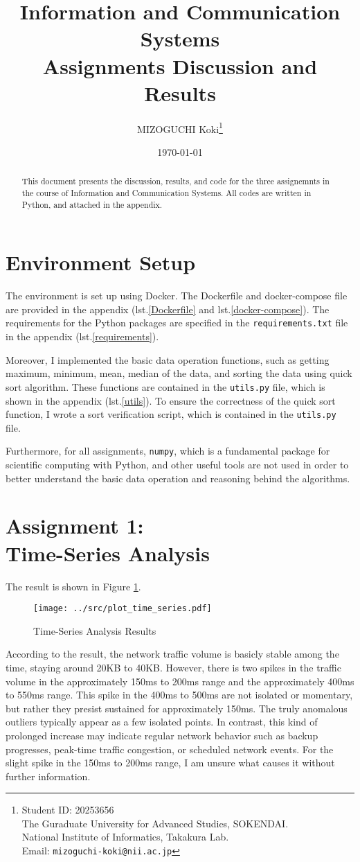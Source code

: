 \documentclass{article}
\title{Information and Communication Systems\\ Assignments Discussion and Results}
\author{MIZOGUCHI Koki\thanks{Student ID: 20253656\\ The Guraduate University for Advanced Studies, SOKENDAI.\\ National Institute of Informatics, Takakura Lab. \\ Email: \texttt{mizoguchi-koki@nii.ac.jp}}}
\date{\today}
\begin{document}
\maketitle
\begin{abstract}
	This document presents the discussion, results, and code for the three assignemnts in the course of Information and Communication Systems.
	All codes are written in Python, and attached in the appendix.
\end{abstract}
\section{Environment Setup}
The environment is set up using Docker.
The Dockerfile and docker-compose file are provided in the appendix (lst.\ref{Dockerfile} and lst.\ref{docker-compose}).
The requirements for the Python packages are specified in the \texttt{requirements.txt} file in the appendix (lst.\ref{requirements}).

Moreover, I implemented the basic data operation functions, such as getting maximum, minimum, mean, median of the data, and sorting the data using quick sort algorithm.
These functions are contained in the \texttt{utils.py} file, which is shown in the appendix (lst.\ref{utils}).
To ensure the correctness of the quick sort function, I wrote a sort verification script, which is contained in the \texttt{utils.py} file.

Furthermore, for all assignments, \texttt{numpy}, which is a fundamental package for scientific computing with Python, and other useful tools are not used in order to better understand the basic data operation and reasoning behind the algorithms.
\section{Assignment 1:\\ Time-Series Analysis}
The result is shown in Figure \ref{fig:time_series_analysis}.

\begin{figure}[h]
	\centering
	\texttt{[image: ../src/plot\_time\_series.pdf]}
	\caption{Time-Series Analysis Results}
	\label{fig:time_series_analysis}
\end{figure}
According to the result, the network traffic volume is basicly stable among the time, staying around 20KB to 40KB.
However, there is two spikes in the traffic volume in the approximately 150ms to 200ms range and the approximately 400ms to 550ms range.
This spike in the 400ms to 500ms are not isolated or momentary, but rather they presist sustained for approximately 150ms.
The truly anomalous outliers typically appear as a few isolated points.
In contrast, this kind of prolonged increase may indicate regular network behavior such as backup progresses, peak-time traffic congestion, or scheduled network events.
For the slight spike in the 150ms to 200ms range, I am unsure what causes it without further information.
\end{document}
